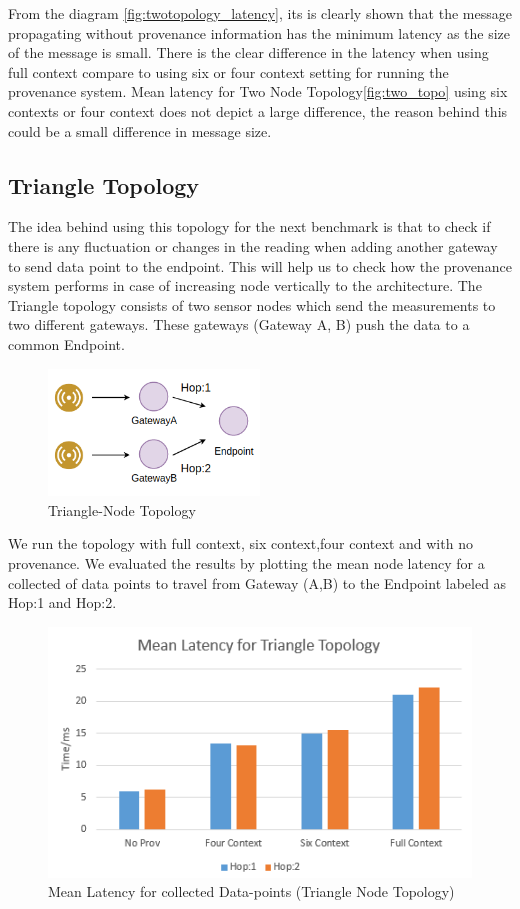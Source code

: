 From the diagram \ref{fig:twotopology_latency}, its is clearly shown that the message propagating without provenance information has the minimum latency as the size of the message is small. There is the clear difference in the latency when using full context compare to using six or four context setting for running the provenance system. Mean latency for Two Node Topology\ref{fig:two_topo} using six contexts or four context does not depict a large difference, the reason behind this could be a small difference in message size.


\subsection*{Triangle Topology}
The idea behind using this topology for the next benchmark is that to check if there is any fluctuation or changes in the reading when adding another gateway to send data point to the endpoint. This will help us to check how the provenance system performs in case of increasing node vertically to the architecture. The Triangle topology consists of two sensor nodes which send the measurements to two different gateways. These gateways (Gateway A, B) push the data to a common Endpoint.

\begin{figure}[H]
	\center
	\includegraphics[width=0.5\textwidth]{figures/latencytopo_triangle.png}
	\caption{Triangle-Node Topology}
	\label{fig:triangle_topo}
\end{figure}

We run the topology with full context, six context,four context and with no provenance. We evaluated the results by plotting the mean node latency for a collected of data points
to travel from Gateway (A,B) to the Endpoint labeled as Hop:1  and Hop:2.
\begin{figure}[H]
	\center
	\includegraphics[width=\textwidth]{figures/triangletopology_latency.PNG}
	\caption{Mean Latency for collected Data-points  (Triangle Node Topology)}
	\label{fig:triangletopology_latency}
\end{figure}


